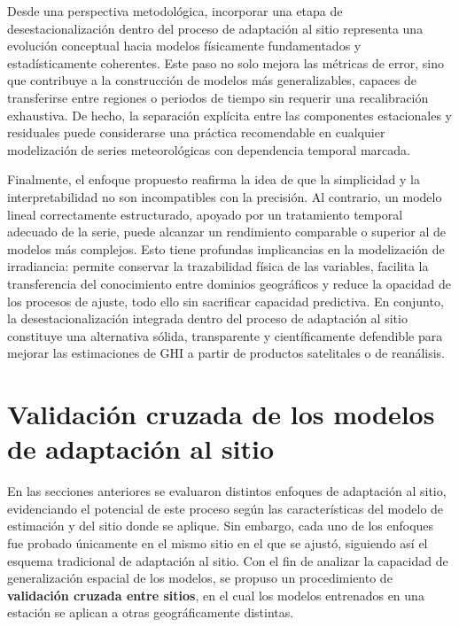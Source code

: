 \documentclass[letterpaper,12pt, twoside]{report}
\providecommand{\DIFdeltex}[1]{{\protect\color{red} \scriptsize #1}} %
\providecommand{\DIFdel}[1]{\texorpdfstring{\DIFdeltex{#1}}{}} %
\begin{document}
\DIFdel{Desde una perspectiva metodológica, incorporar una etapa de desestacionalización dentro del proceso de adaptación al sitio representa una evolución conceptual hacia modelos físicamente fundamentados y estadísticamente coherentes. Este paso no solo mejora las métricas de error, sino que contribuye a la construcción de modelos más generalizables, capaces de transferirse entre regiones o periodos de tiempo sin requerir una recalibración exhaustiva. De hecho, la separación explícita entre las componentes estacionales y residuales puede considerarse una práctica recomendable en cualquier modelización de series meteorológicas con dependencia temporal marcada.
}%

\DIFdel{Finalmente, el enfoque propuesto reafirma la idea de que la simplicidad y la interpretabilidad no son incompatibles con la precisión. Al contrario, un modelo lineal correctamente estructurado, apoyado por un tratamiento temporal adecuado de la serie, puede alcanzar un rendimiento comparable o superior al de modelos más complejos. Esto tiene profundas implicancias en la modelización de irradiancia: permite conservar la trazabilidad física de las variables, facilita la transferencia del conocimiento entre dominios geográficos y reduce la opacidad de los procesos de ajuste, todo ello sin sacrificar capacidad predictiva. En conjunto, la desestacionalización integrada dentro del proceso de adaptación al sitio constituye una alternativa sólida, transparente y científicamente defendible para mejorar las estimaciones de GHI a partir de productos satelitales o de reanálisis.
}%

\section{\DIFdel{Validación cruzada de los modelos de adaptación al sitio}}
\addtocounter{section}{-1}%

\DIFdel{En las secciones anteriores se evaluaron distintos enfoques de adaptación al sitio, evidenciando el potencial de este proceso según las características del modelo de estimación y del sitio donde se aplique. Sin embargo, cada uno de los enfoques fue probado únicamente en el mismo sitio en el que se ajustó, siguiendo así el esquema tradicional de adaptación al sitio. Con el fin de analizar la capacidad de generalización espacial de los modelos, se propuso un procedimiento de \textbf{validación cruzada entre sitios}, en el cual los modelos entrenados en una estación se aplican a otras geográficamente distintas.
}%
\end{document}
